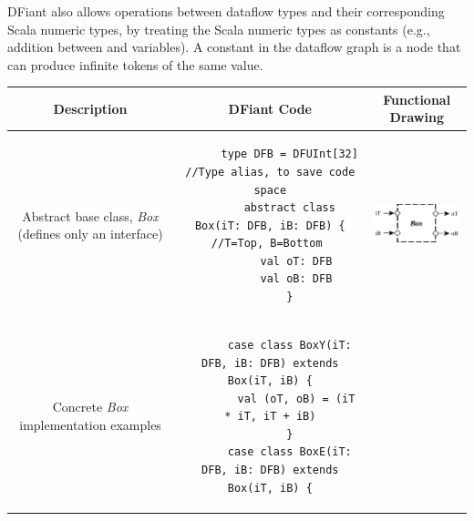 DFiant also allows operations between dataflow types and their corresponding Scala numeric types, by treating the Scala numeric types as constants (e.g., addition between  and  variables). A constant in the dataflow graph is a node that can produce infinite tokens of the same value.   

\begin{table}[t]
  \label{tbl:Box}
  \begin{tabular}{|c|c|c|}
    \hline 
    \textbf{Description} & \textbf{DFiant Code} & \textbf{Functional Drawing} \\ 
    \hline
    \begin{minipage}{0.1\textwidth}
      \footnotesize
      \flushleft
      Abstract base class, \textit{Box} (defines only an interface)
    \end{minipage} 
    &
    \begin{minipage}{0.48\textwidth}
      \begin{verbatim}
      type DFB = DFUInt[32] //Type alias, to save code space
      abstract class Box(iT: DFB, iB: DFB) { //T=Top, B=Bottom 
        val oT: DFB
        val oB: DFB
      }
      \end{verbatim}
    \end{minipage} 
    &  
    \begin{minipage}[c][1.5cm]{0.34\textwidth}
      \centering
      \includegraphics[height=1.3cm]{graphics/Box.pdf}%
    \end{minipage} 
    \\ 
    \hline 
    \begin{minipage}{0.1\textwidth}
      \footnotesize
      \flushleft
      Concrete \textit{Box} implementation examples
    \end{minipage} 
    &
    \begin{minipage}{0.48\textwidth}
      \begin{verbatim}
      case class BoxY(iT: DFB, iB: DFB) extends Box(iT, iB) {
        val (oT, oB) = (iT * iT, iT + iB)
      }
      case class BoxE(iT: DFB, iB: DFB) extends Box(iT, iB) {

\end{verbatim}
\end{minipage}
\end{tabular}
\end{table}
